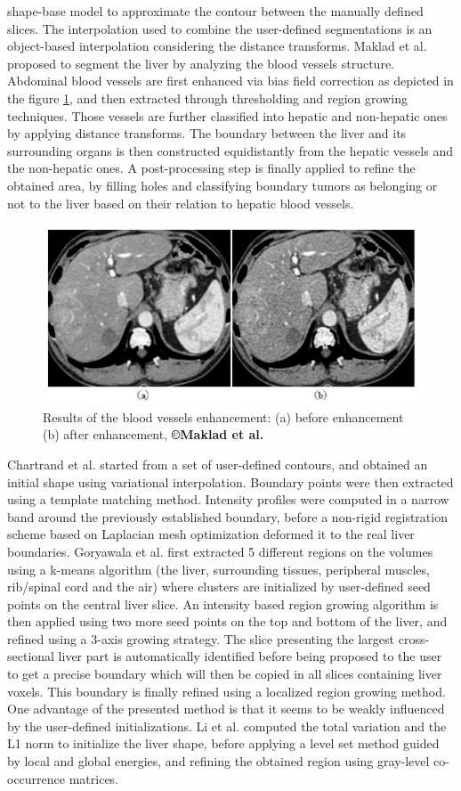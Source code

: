 shape-base model to approximate the contour between the manually defined
slices. The interpolation used to combine the user-defined segmentations
is an object-based interpolation considering the distance transforms.
Maklad et al. \cite{Maklad2013} proposed to segment the liver by analyzing the blood vessels
structure. Abdominal blood vessels are first enhanced via bias field correction as depicted in the figure \ref{Maklad2013_Fig1}, and then extracted through thresholding
and region growing techniques. Those vessels are further classified into
hepatic and non-hepatic ones by applying distance transforms. The
boundary between the liver and its surrounding organs is then
constructed equidistantly from the hepatic vessels and the non-hepatic
ones. A post-processing step is finally applied to refine the obtained
area, by filling holes and classifying boundary tumors as belonging or
not to the liver based on their relation to hepatic blood vessels.

\begin{figure}[th!]
	\centering
	\includegraphics[width=0.5\linewidth]{images/Maklad2013_Fig1}
	\caption{Results of the blood vessels enhancement: (a) before enhancement (b) after enhancement, \textbf{©Maklad et al. \cite{Maklad2013}}}
	\label{Maklad2013_Fig1}
\end{figure}

Chartrand et al. \cite{Chartrand2014} started from a set of user-defined contours, and obtained an
initial shape using variational interpolation. Boundary points were then
extracted using a template matching method. Intensity profiles were
computed in a narrow band around the previously established boundary,
before a non-rigid registration scheme based on Laplacian mesh
optimization deformed it to the real liver boundaries.
Goryawala et al. \cite{Goryawala2014} first extracted 5 different regions on the volumes using
a k-means algorithm (the liver, surrounding tissues, peripheral muscles,
rib/spinal cord and the air) where clusters are initialized by
user-defined seed points on the central liver slice. An intensity based
region growing algorithm is then applied using two more seed points on
the top and bottom of the liver, and refined using a 3-axis growing
strategy. The slice presenting the largest cross-sectional liver part is
automatically identified before being proposed to the user to get a
precise boundary which will then be copied in all slices containing
liver voxels. This boundary is finally refined using a localized region
growing method. One advantage of the presented method is that it seems
to be weakly influenced by the user-defined initializations. Li et al. \cite{Li2014b} computed the total variation and the L1 norm to initialize the
liver shape, before applying a level set method guided by local and
global energies, and refining the obtained region using gray-level
co-occurrence matrices.

